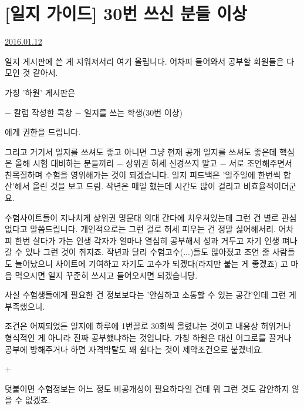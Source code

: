 \section{[일지 가이드] 30번 쓰신 분들 이상}
\href{https://www.kockoc.com/Apoc/586339}{2016.01.12}

\vspace{5mm}

일지 게시판에 쓴 게 지워져서리 여기 올립니다.
어차피 들어와서 공부할 회원들은 다 모인 것 같아서.
\vspace{5mm}

가칭 '하원' 게시판은
\vspace{5mm}

$-$ 칼럼 작성한 콕창
$-$ 일지를 쓰는 학생(30번 이상)
\vspace{5mm}

에게 권한을 드립니다.
\vspace{5mm}

그리고 거기서 일지를 쓰셔도 좋고 아니면 그냥 현재 공개 일지를 쓰셔도 좋은데
핵심은 올해 시험 대비하는 분들끼리 $-$ 상위권 허세 신경쓰지 말고 $-$ 서로 조언해주면서 친목질하며 수험을 영위해가는 것이 되겠습니다.
일지 피드백은 '일주일에 한번씩 합산'해서 올린 것을 보고 드림.
작년은 매일 했는데 시간도 많이 걸리고 비효율적이더군요.
\vspace{5mm}

수험사이트들이 지나치게 상위권 명문대 의대 간다에 치우쳐있는데
그런 건 별로 관심없다고 말씀드립니다. 개인적으로는 그런 걸로 허세 피우는 건 정말 싫어해서리.
어차피 한번 살다가 가는 인생 각자가 얼마나 열심히 공부해서 성과 거두고 자기 인생 펴나갈 수 있나 그런 것이 취지죠.
작년과 달리 수험고수(...)들도 많아졌고 조언 줄 사람들도 늘어났으니 사이트에 기여하고 자기도 고수가 되겠다(라지만 붙는 게 좋겠죠)
고 마음 먹으시면 일지 꾸준히 쓰시고 들어오시면 되겠습니당.
\vspace{5mm}

사실 수험생들에게 필요한 건 정보보다는 '안심하고 소통할 수 있는 공간'인데
그런 게 부족했으니.
\vspace{5mm}

조건은 어찌되었든 일지에 하루에 1번꼴로 30회씩 올렸냐는 것이고
내용상 허위거나 형식적인 게 아니라 진짜 공부했냐하는 것입니다.
가칭 하원은 대신 어그로를 끌거나 공부에 방해주거나 하면 자격박탈도 꽤 쉽다는 것이 제약조건으로 붙겠네요.
\vspace{5mm}

+
\vspace{5mm}

덧붙이면 수험정보는 어느 정도 비공개성이 필요하다일 건데 뭐 그런 것도 감안하지 않을 수 없겠죠.
\vspace{5mm}









